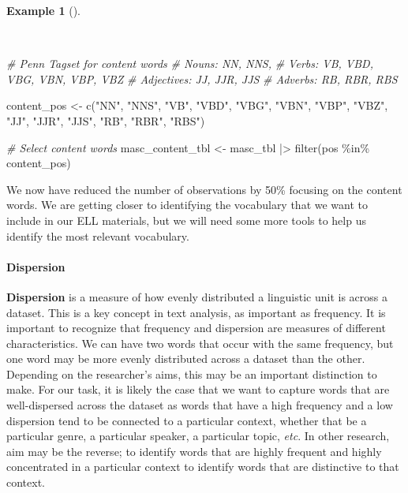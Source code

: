 \documentclass[
  letterpaper,
  DIV=11,
  numbers=noendperiod]{scrreport}
\let\oldparagraph\paragraph
\renewcommand{\paragraph}[1]{\oldparagraph{#1}\mbox{}}
\newenvironment{Shaded}{\begin{snugshade}}{\end{snugshade}}
\newcommand{\CommentTok}[1]{\textcolor[rgb]{0.00,0.00,0.00}{\textit{#1}}}
\newcommand{\FunctionTok}[1]{\textcolor[rgb]{0.00,0.00,0.00}{#1}}
\newcommand{\NormalTok}[1]{\textcolor[rgb]{0.00,0.00,0.00}{#1}}
\newcommand{\OtherTok}[1]{\textcolor[rgb]{0.00,0.00,0.00}{#1}}
\newcommand{\SpecialCharTok}[1]{\textcolor[rgb]{0.00,0.00,0.00}{#1}}
\newcommand{\StringTok}[1]{\textcolor[rgb]{0.00,0.00,0.00}{#1}}
\theoremstyle{definition}
\newtheorem{example}{Example}[chapter]
\theoremstyle{remark}
\begin{document}
\begin{example}[]\protect\hypertarget{exm-eda-masc-filter-pos}{}\label{exm-eda-masc-filter-pos}

~

\begin{Shaded}
\begin{Highlighting}[]
\CommentTok{\# Penn Tagset for content words}
\CommentTok{\# Nouns: NN, NNS,}
\CommentTok{\# Verbs: VB, VBD, VBG, VBN, VBP, VBZ}
\CommentTok{\# Adjectives: JJ, JJR, JJS}
\CommentTok{\# Adverbs: RB, RBR, RBS}

\NormalTok{content\_pos }\OtherTok{\textless{}{-}} \FunctionTok{c}\NormalTok{(}\StringTok{"NN"}\NormalTok{, }\StringTok{"NNS"}\NormalTok{, }\StringTok{"VB"}\NormalTok{, }\StringTok{"VBD"}\NormalTok{, }\StringTok{"VBG"}\NormalTok{, }\StringTok{"VBN"}\NormalTok{, }\StringTok{"VBP"}\NormalTok{, }\StringTok{"VBZ"}\NormalTok{, }\StringTok{"JJ"}\NormalTok{, }\StringTok{"JJR"}\NormalTok{, }\StringTok{"JJS"}\NormalTok{, }\StringTok{"RB"}\NormalTok{, }\StringTok{"RBR"}\NormalTok{, }\StringTok{"RBS"}\NormalTok{)}

\CommentTok{\# Select content words}
\NormalTok{masc\_content\_tbl }\OtherTok{\textless{}{-}} 
\NormalTok{  masc\_tbl }\SpecialCharTok{|\textgreater{}} 
  \FunctionTok{filter}\NormalTok{(pos }\SpecialCharTok{\%in\%}\NormalTok{ content\_pos)}
\end{Highlighting}
\end{Shaded}

\end{example}

We now have reduced the number of observations by 50\% focusing on the
content words. We are getting closer to identifying the vocabulary that
we want to include in our ELL materials, but we will need some more
tools to help us identify the most relevant vocabulary.

\hypertarget{sec-eda-frequency-dispersion}{%
\paragraph{Dispersion}\label{sec-eda-frequency-dispersion}}

\textbf{Dispersion} is a measure of how evenly distributed a linguistic
unit is across a dataset. This is a key concept in text analysis, as
important as frequency. It is important to recognize that frequency and
dispersion are measures of different characteristics. We can have two
words that occur with the same frequency, but one word may be more
evenly distributed across a dataset than the other. Depending on the
researcher's aims, this may be an important distinction to make. For our
task, it is likely the case that we want to capture words that are
well-dispersed across the dataset as words that have a high frequency
and a low dispersion tend to be connected to a particular context,
whether that be a particular genre, a particular speaker, a particular
topic, \emph{etc}. In other research, aim may be the reverse; to
identify words that are highly frequent and highly concentrated in a
particular context to identify words that are distinctive to that
context.
\end{document}
